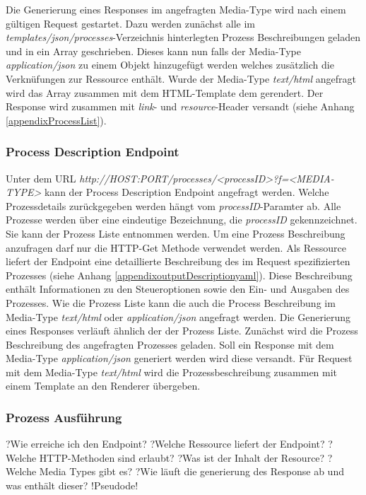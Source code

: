 Die Generierung eines Responses im angefragten Media-Type wird nach einem gültigen Request gestartet. 
Dazu werden zunächst alle im \textit{templates/json/processes}-Verzeichnis hinterlegten Prozess Beschreibungen geladen und in ein Array geschrieben. 
Dieses kann nun falls der Media-Type \textit{application/json} zu einem Objekt hinzugefügt werden welches zusätzlich die Verknüfungen zur Ressource enthält. 
Wurde der Media-Type \textit{text/html} angefragt wird das Array zusammen mit dem HTML-Template dem gerendert. 
Der Response wird zusammen mit \textit{link}- und \textit{resource}-Header versandt (siehe Anhang \ref{appendixProcessList}).

\subsubsection{Process Description Endpoint}
Unter dem URL \textit{http://HOST:PORT/processes/<processID>?f=<MEDIA-TYPE>} kann der Process Description Endpoint angefragt werden. Welche Prozessdetails zurückgegeben werden hängt vom \textit{processID}-Paramter ab. Alle Prozesse werden über eine 
eindeutige Bezeichnung, die \textit{processID} gekennzeichnet. Sie kann der Prozess Liste entnommen werden. Um eine Prozess Beschreibung anzufragen darf nur die HTTP-Get Methode verwendet werden.   
Als Ressource liefert der Endpoint eine detaillierte Beschreibung des im Request spezifizierten Prozesses (siehe Anhang \ref{appendixoutputDescriptionyaml}). Diese Beschreibung enthält Informationen zu den Steueroptionen sowie den Ein- und Ausgaben des Prozesses.
Wie die Prozess Liste kann die auch die Process Beschreibung im Media-Type \textit{text/html} oder \textit{application/json} angefragt werden. 
Die Generierung eines Responses verläuft ähnlich der der Prozess Liste. Zunächst wird die Prozess Beschreibung des angefragten Prozesses geladen. Soll ein Response mit dem Media-Type \textit{application/json} generiert werden wird diese versandt. 
Für Request mit dem Media-Type \textit{text/html} wird die Prozessbeschreibung zusammen mit einem Template an den Renderer übergeben. 

\subsubsection{Prozess Ausführung}
?Wie erreiche ich den Endpoint?
?Welche Ressource liefert der Endpoint?
?Welche HTTP-Methoden sind erlaubt?
?Was ist der Inhalt der Resource?
?Welche Media Types gibt es?
?Wie läuft die generierung des Response ab und was enthält dieser?
!Pseudode!
